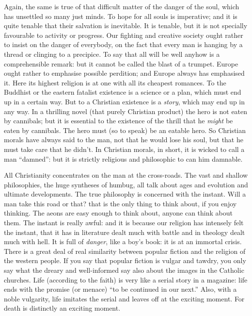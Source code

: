 \documentclass{book}
\begin{document}
Again, the same is true of that difficult matter of the danger of the soul, which has unsettled so many just minds. To hope for all souls is imperative; and it is quite tenable that their salvation is inevitable. It is tenable, but it is not specially favourable to activity or progress. Our fighting and creative society ought rather to insist on the danger of everybody, on the fact that every man is hanging by a thread or clinging to a precipice. To say that all will be well anyhow is a comprehensible remark: but it cannot be called the blast of a trumpet. Europe ought rather to emphasise possible perdition; and Europe always has emphasised it. Here its highest religion is at one with all its cheapest romances. To the Buddhist or the eastern fatalist existence is a science or a plan, which must end up in a certain way. But to a Christian existence is a \emph{story}, which may end up in any way. In a thrilling novel (that purely Christian product) the hero is not eaten by cannibals; but it is essential to the existence of the thrill that he \emph{might} be eaten by cannibals. The hero must (so to speak) be an eatable hero. So Christian morals have always said to the man, not that he would lose his soul, but that he must take care that he didn’t. In Christian morals, in short, it is wicked to call a man “damned”: but it is strictly religious and philosophic to can him damnable.

All Christianity concentrates on the man at the cross-roads. The vast and shallow philosophies, the huge syntheses of humbug, all talk about ages and evolution and ultimate developments. The true philosophy is concerned with the instant. Will a man take this road or that? that is the only thing to think about, if you enjoy thinking. The aeons are easy enough to think about, anyone can think about them. The instant is really awful: and it is because our religion has intensely felt the instant, that it has in literature dealt much with battle and in theology dealt much with hell. It is full of \emph{danger}, like a boy’s book: it is at an immortal crisis. There is a great deal of real similarity between popular fiction and the religion of the western people. If you say that popular fiction is vulgar and tawdry, you only say what the dreary and well-informed say also about the images in the Catholic churches. Life (according to the faith) is very like a serial story in a magazine: life ends with the promise (or menace) “to be continued in our next.” Also, with a noble vulgarity, life imitates the serial and leaves off at the exciting moment. For death is distinctly an exciting moment.
\end{document}

